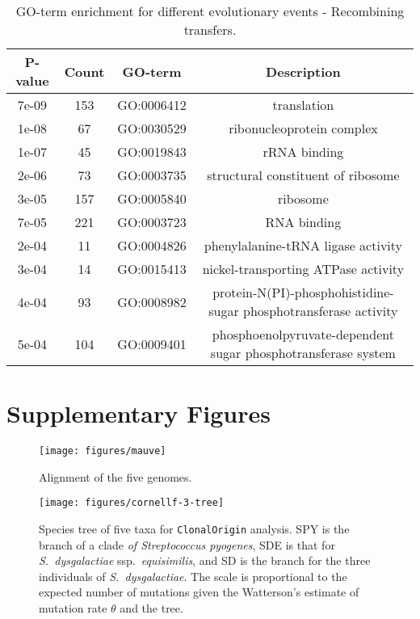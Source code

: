 \documentclass[english]{article}
\begin{document}
%
\begin{table}
\caption{\label{tab:go-events}GO-term enrichment for different
evolutionary events - Recombining transfers.}
\begin{tabular}{cccc}
\hline 
P-value & Count & GO-term & Description \\
\hline 
7e-09 & 153 & GO:0006412 & translation\\
1e-08 &  67 & GO:0030529 & ribonucleoprotein complex\\
1e-07 &  45 & GO:0019843 & rRNA binding\\
2e-06 &  73 & GO:0003735 & structural constituent of ribosome\\
3e-05 & 157 & GO:0005840 & ribosome\\
7e-05 & 221 & GO:0003723 & RNA binding\\
2e-04 &  11 & GO:0004826 & phenylalanine-tRNA ligase activity\\
3e-04 &  14 & GO:0015413 & nickel-transporting ATPase activity\\
4e-04 &  93 & GO:0008982 & protein-N(PI)-phosphohistidine-sugar phosphotransferase activity\\
5e-04 & 104 & GO:0009401 & phosphoenolpyruvate-dependent sugar phosphotransferase system\\
\hline 
\end{tabular}
\end{table}
\clearpage{}

\section*{Supplementary Figures}

\clearpage{}

\begin{figure}
\begin{center}
\texttt{[image: figures/mauve]}
\end{center}
\caption{Alignment of the five genomes.}
\label{fig:mauve}
\end{figure}
\clearpage{}

\begin{figure}
\texttt{[image: figures/cornellf-3-tree]}
\caption{\label{fig:tree5}Species tree of five taxa for \texttt{ClonalOrigin} analysis.
SPY is the branch of a clade\textit{ of Streptococcus pyogenes}, SDE
is that for \textit{S.\ dysgalactiae} ssp.\textit{\ equisimilis}, and SD is the
branch for the three individuals of \textit{S.\ dysgalactiae}. The scale is
proportional to the expected number of mutations given the Watterson's estimate 
of mutation
rate $\theta$ and the tree.}
\end{figure}
\clearpage{}%
\end{document}
